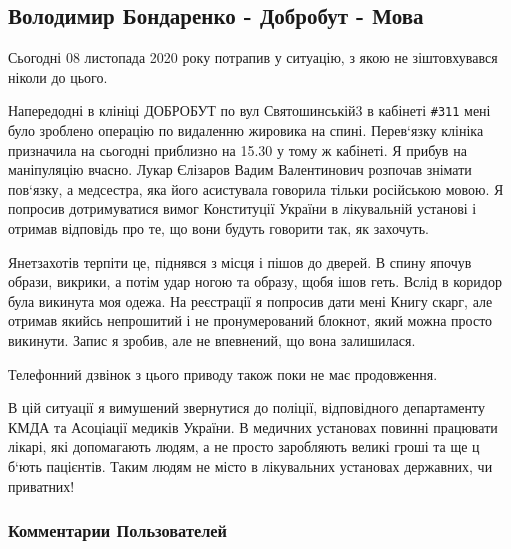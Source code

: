  
 
 

\subsection{Володимир Бондаренко - Добробут - Мова}
\label{sec:08_11_2020.fb.volodymyr_bondarenko.1.mova_dobrobut}

Сьогодні 08 листопада 2020 року потрапив у ситуацію, з якою не зіштовхувався ніколи до цього. 

Напередодні в клініці ДОБРОБУТ по вул Святошинській3  в кабінеті \verb|#311| мені було
зроблено операцію по видаленню жировика на спині. Перев‘язку клініка призначила
на сьогодні приблизно на 15.30 у тому ж кабінеті. Я прибув на маніпуляцію
вчасно. Лукар Єлізаров Вадим Валентинович розпочав знімати пов‘язку, а
медсестра, яка його асистувала говорила тільки російською мовою. Я попросив
дотримуватися вимог Конституції України в лікувальній установі і отримав
відповідь про те, що вони будуть говорити так, як захочуть.

Янетзахотів терпіти це, піднявся з місця і пішов до дверей. В спину япочув
образи, викрики, а потім удар ногою та образу, щобя ішов геть.  Вслід в коридор
була викинута моя одежа. На реєстрації я попросив дати мені Книгу скарг, але
отримав якийсь непрошитий і не пронумерований блокнот, який можна просто
викинути. Запис я зробив, але не впевнений, що вона залишилася. 

Телефонний дзвінок з цього приводу також поки не має продовження.

В цій ситуації я вимушений звернутися до поліції, відповідного департаменту
КМДА  та Асоціації медиків України.  В медичних установах повинні працювати
лікарі, які допомагають людям, а не просто заробляють великі гроші та ще ц
б‘ють пацієнтів. Таким людям не місто в лікувальних установах державних, чи
приватних!

\subsubsection{Комментарии Пользователей}

